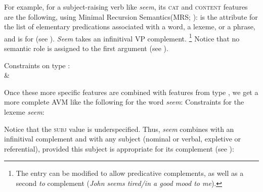 \documentclass[output=paper
	        ,collection
	        ,collectionchapter
 	        ,biblatex
                ,babelshorthands
                ,newtxmath
                ,draftmode
                ,colorlinks, citecolor=brown
]{langscibook}
\begin{document}
For example, for a subject-raising verb like \emph{seem}, its \textsc{cat} and \textsc{content}
features are the following, using Minimal Recursion Semantics\indexmrs (MRS; \citealp{CFPS2005a}):  is the
attribute for the list of elementary predications associated with a word, a lexeme, or a phrase, and
 is for  (see ). \emph{Seem} takes an infinitival VP complement.%
%
\footnote{The entry can be modified to allow predicative complements, as well as a second \emph{to} complement (\emph{John seems tired/in a good mood to me}).}
%
Notice that no semantic role is assigned to the first argument (see ).

\eas
Constraints on type :\label{ex:prop23}\\
 \impl {} \&\\
\zs

\noindent
Once these more specific features are combined with features from type , we get a
more complete AVM like the following for the word \emph{seem}:
\ea\label{ex:prop24}
Constraints for the lexeme \emph{seem}:\\
\z

\noindent
Notice that the \textsc{subj} value is underspecified. Thus, \emph{seem} combines with an
infinitival complement and with any subject (nominal or verbal, expletive or referential), provided
this subject is appropriate for its complement (see
): 
\end{document}
